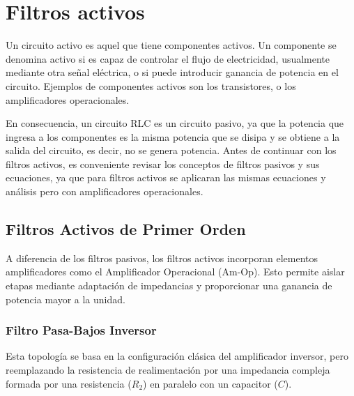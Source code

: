 \chapter{Filtros activos}

Un circuito activo es aquel que tiene componentes activos. Un componente se denomina activo si es capaz de controlar el flujo de electricidad, usualmente mediante otra señal eléctrica, o si puede introducir ganancia de potencia en el circuito. Ejemplos de componentes activos son los transistores, o los amplificadores operacionales.

En consecuencia, un circuito RLC es un circuito pasivo, ya que la potencia que ingresa a los componentes es la misma potencia que se disipa y se obtiene a la salida del circuito, es decir, no se genera potencia. Antes de continuar con los filtros activos, es conveniente revisar los conceptos de filtros pasivos y sus ecuaciones, ya que para filtros activos se aplicaran las mismas ecuaciones y análisis pero con amplificadores operacionales.

\section{Filtros Activos de Primer Orden}

A diferencia de los filtros pasivos, los filtros activos incorporan elementos amplificadores como el Amplificador Operacional (Am-Op). Esto permite aislar etapas mediante adaptación de impedancias y proporcionar una ganancia de potencia mayor a la unidad.

\subsection{Filtro Pasa-Bajos Inversor}

Esta topología se basa en la configuración clásica del amplificador inversor, pero reemplazando la resistencia de realimentación por una impedancia compleja formada por una resistencia (\(R_2\)) en paralelo con un capacitor (\(C\)).

